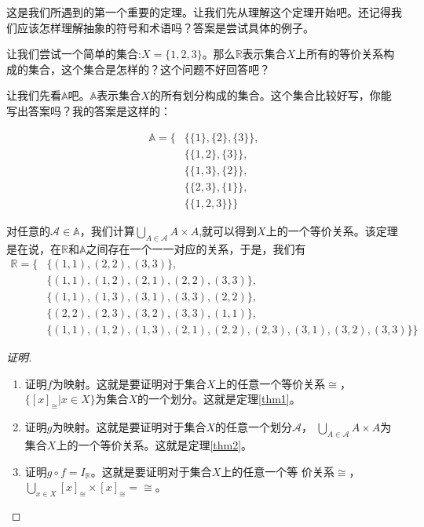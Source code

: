 \documentclass{article}
\begin{document}
\begin{CJK*}{UTF8}{gbsn}
  这是我们所遇到的第一个重要的定理。让我们先从理解这个定理开始吧。还记得我们应该怎样理解抽象的符号和术语吗？答案是尝试具体的例子。

  让我们尝试一个简单的集合:$X=\{1,2,3\}$。那么$\mathbb{R}$表示集合$X$上所有的等价关系构成的集合，这个集合是怎样的？这个问题不好回答吧？

  让我们先看$\mathbb{A}$吧。$\mathbb{A}$表示集合$X$的所有划分构成的集合。这个集合比较好写，你能写出答案吗？我的答案是这样的：

  \begin{equation*}
    \begin{split}
      \mathbb{A}=\{&\{\{1\},\{2\},\{3\}\},\\
      &\{\{1,2\},\{3\}\},\\
      &\{\{1,3\},\{2\}\},\\
      &\{\{2,3\},\{1\}\},\\
      &\{\{1,2,3\}\}\}
    \end{split}
  \end{equation*}

  对任意的$\mathscr{A}\in \mathbb{A}$，我们计算$\bigcup_{A \in \mathscr{A}}A\times A$,就可以得到$X$上的一个等价关系。该定理是在说，在$\mathbb{R}$和$\mathbb{A}$之间存在一个一一对应的关系，于是，我们有
  \begin{equation*}
    \begin{split}
      \mathbb{R}=\{&\{(1,1),(2,2),(3,3)\},\\
      &\{(1,1),(1,2),(2,1),(2,2),(3,3)\},\\
      &\{(1,1),(1,3),(3,1),(3,3),(2,2)\},\\
      &\{(2,2),(2,3),(3,2),(3,3),(1,1)\},\\
      &\{(1,1),(1,2),(1,3),(2,1),(2,2),(2,3),(3,1),(3,2),(3,3)\}\}      
    \end{split}
  \end{equation*}
  \begin{proof}[证明]
    \begin{enumerate}
    \item 证明$f$为映射。这就是要证明对于集合$X$上的任意一个等价关系$\cong$，　
      $\{[x]_{\cong}|x\in X\}$为集合$X$的一个划分。这就是定理\ref{thm1}。
    \item 证明$g$为映射。这就是要证明对于集合$X$的任意一个划分$\mathscr{A}$，
      $\bigcup_{A\in \mathscr{A}}A\times A$为集合$X$上的一个等价关系。这就是定理\ref{thm2}。
    \item 证明$g\circ f = I_{\mathbb{R}}$。这就是要证明对于集合$X$上的任意一个等
      价关系$\cong$，$\bigcup_{x\in X}[x]_{\cong}\times [x]_{\cong} = \cong$。


\end{enumerate}
\end{proof}
\end{CJK*}
\end{document}
